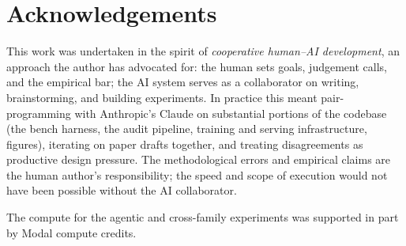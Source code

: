 \section*{Acknowledgements}

This work was undertaken in the spirit of \emph{cooperative human--AI development}, an approach the author has advocated for: the human sets goals, judgement calls, and the empirical bar; the AI system serves as a collaborator on writing, brainstorming, and building experiments. In practice this meant pair-programming with Anthropic's Claude on substantial portions of the codebase (the bench harness, the audit pipeline, training and serving infrastructure, figures), iterating on paper drafts together, and treating disagreements as productive design pressure. The methodological errors and empirical claims are the human author's responsibility; the speed and scope of execution would not have been possible without the AI collaborator.

The compute for the agentic and cross-family experiments was supported in part by Modal compute credits.
